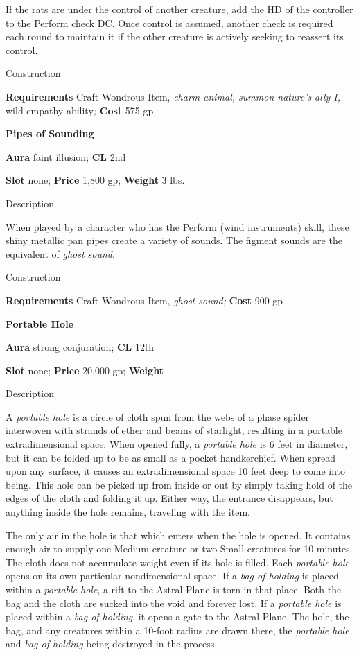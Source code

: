If the rats are under the control of another creature, add the HD of the controller to the Perform check DC. Once control is assumed, another check is required each round to maintain it if the other creature is actively seeking to reassert its control. 
				
Construction
				
\textbf{Requirements} Craft Wondrous Item,\textit{ charm animal, summon nature's ally I, }wild empathy ability\textit{;}\textbf{ Cost }575 gp
				
\textbf{Pipes of Sounding}
				
\textbf{Aura} faint illusion;\textbf{ CL }2nd
				
\textbf{Slot} none; \textbf{Price} 1,800 gp; \textbf{Weight} 3 lbs.
				
Description
				
When played by a character who has the Perform (wind instruments) skill, these shiny metallic pan pipes create a variety of sounds. The figment sounds are the equivalent of \textit{ghost sound}. 
				
Construction
				
\textbf{Requirements} Craft Wondrous Item,\textit{ ghost sound;}\textbf{ Cost }900 gp
				
\textbf{Portable Hole}
				
\textbf{Aura} strong conjuration;\textbf{ CL }12th
				
\textbf{Slot} none; \textbf{Price} 20,000 gp; \textbf{Weight }---
				
Description
				
A \textit{portable hole} is a circle of cloth spun from the webs of a phase spider interwoven with strands of ether and beams of starlight, resulting in a portable extradimensional space. When opened fully, a \textit{portable hole} is 6 feet in diameter, but it can be folded up to be as small as a pocket handkerchief. When spread upon any surface, it causes an extradimensional space 10 feet deep to come into being. This hole can be picked up from inside or out by simply taking hold of the edges of the cloth and folding it up. Either way, the entrance disappears, but anything inside the hole remains, traveling with the item.
				
The only air in the hole is that which enters when the hole is opened. It contains enough air to supply one Medium creature or two Small creatures for 10 minutes. The cloth does not accumulate weight even if its hole is filled. Each \textit{portable hole} opens on its own particular nondimensional space. If a \textit{bag of holding} is placed within a \textit{portable hole}, a rift to the Astral Plane is torn in that place. Both the bag and the cloth are sucked into the void and forever lost. If a \textit{portable hole} is placed within a \textit{bag of holding}, it opens a gate to the Astral Plane. The hole, the bag, and any creatures within a 10-foot radius are drawn there, the \textit{portable hole} and \textit{bag of holding} being destroyed in the process. 
				
